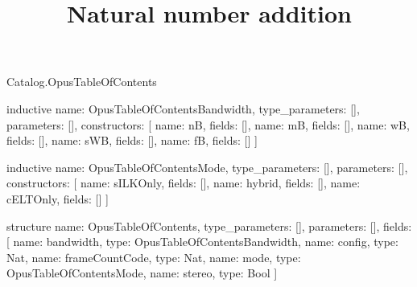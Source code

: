 \begin{lexlean}{Catalog.OpusTableOfContents}
\title{Natural number addition}
\begin{semanticmodule}
inductive{
  name: OpusTableOfContentsBandwidth,
  type_parameters: [],
  parameters: [],
  constructors: [
    {name: nB, fields: []},
    {name: mB, fields: []},
    {name: wB, fields: []},
    {name: sWB, fields: []},
    {name: fB, fields: []}
  ]
}

inductive{
  name: OpusTableOfContentsMode,
  type_parameters: [],
  parameters: [],
  constructors: [
    {name: sILKOnly, fields: []},
    {name: hybrid, fields: []},
    {name: cELTOnly, fields: []}
  ]
}

structure{
  name: OpusTableOfContents,
  type_parameters: [],
  parameters: [],
  fields: [
    {name: bandwidth, type: OpusTableOfContentsBandwidth},
    {name: config, type: Nat},
    {name: frameCountCode, type: Nat},
    {name: mode, type: OpusTableOfContentsMode},
    {name: stereo, type: Bool}
  ]
}
\end{semanticmodule}
\end{lexlean}
